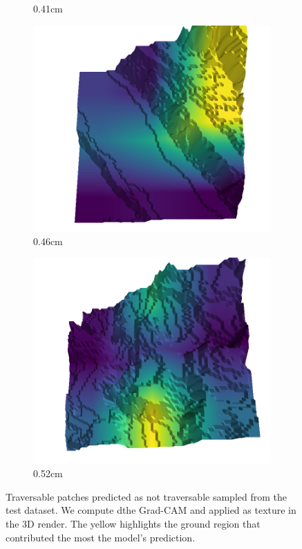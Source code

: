 \begin{figure}[H]
\begin{subfigure}[b]{0.192\linewidth}
    \caption{0.41cm}
    \label{fig : false_positive-18}
    \end{subfigure}
    \begin{subfigure}[b]{0.192\linewidth}
    \includegraphics[width=\linewidth]{../img/5/quarry/false_positive/46-patch-3d-majavi-colormap-216.png}
    \caption{0.46cm}
    \label{fig : false_positive-19}
    \end{subfigure}
    \begin{subfigure}[b]{0.192\linewidth}
    \includegraphics[width=\linewidth]{../img/5/quarry/false_positive/51-patch-3d-majavi-colormap-228.png}
    \caption{0.52cm}
    \label{fig : false_positive-20}
    \end{subfigure}
    \label{fig : false_positive}
    \caption{Traversable patches predicted as not traversable sampled from the test dataset. We compute dthe Grad-CAM and applied as texture in the 3D render. The yellow highlights the ground region that contributed the most the model's prediction. }
    \end{figure}


% 